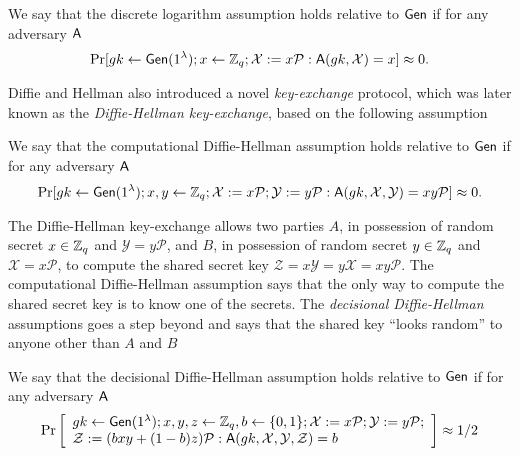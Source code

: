 \begin{definition}
We say that the discrete logarithm assumption holds relative to $\mathsf{Gen}$ if for any adversary $\mathsf{A}$
$$
\Pr[gk\gets\mathsf{Gen}(1^\lambda); x\gets\mathbb{Z}_q; \mathcal{X}:=x\mathcal{P}:\mathsf{A}(gk,\mathcal{X})=x]\approx 0.
$$
\end{definition}
 
Diffie and Hellman also introduced a novel \emph{key-exchange} protocol, which was later known as the \emph{Diffie-Hellman key-exchange}, based on the following assumption

\begin{definition}
We say that the computational Diffie-Hellman assumption holds relative to $\mathsf{Gen}$ if for any adversary $\mathsf{A}$
$$
\Pr[gk\gets\mathsf{Gen}(1^\lambda); x,y\gets\mathbb{Z}_q; \mathcal{X}:=x\mathcal{P};\mathcal{Y}:=y\mathcal{P}:\mathsf{A}(gk,\mathcal{X},\mathcal{Y})=xy\mathcal{P}]\approx 0.
$$
\end{definition}

The Diffie-Hellman key-exchange allows two parties $A$, in possession of random secret $x\in\mathbb{Z}_q$ and $\mathcal{Y}=y\mathcal{P}$, and $B$, in possession of random secret $y\in\mathbb{Z}_q$ and $\mathcal{X}=x\mathcal{P}$, to compute the shared secret key $\mathcal{Z}=x\mathcal{Y}=y\mathcal{X}=xy\mathcal{P}$. The computational Diffie-Hellman assumption says that the only way to compute the shared secret key is to know one of the secrets. The \emph{decisional Diffie-Hellman} assumptions goes a step beyond and says that the shared key ``looks random'' to anyone other than $A$ and $B$

\begin{definition}
We say that the decisional Diffie-Hellman assumption holds relative to $\mathsf{Gen}$ if for any adversary $\mathsf{A}$
$$
\Pr\left[\begin{array}{l}
gk\gets\mathsf{Gen}(1^\lambda); x,y,z\gets\mathbb{Z}_q,b\gets\{0,1\};\mathcal{X}:=x\mathcal{P};\mathcal{Y}:=y\mathcal{P};\\
\mathcal{Z}:=(bxy+(1-b)z)\mathcal{P}:\mathsf{A}(gk,\mathcal{X},\mathcal{Y},\mathcal{Z})=b
\end{array}\right]\approx 1/2
$$
\end{definition}


